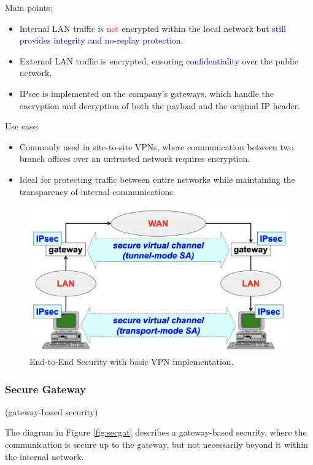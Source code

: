 Main points:
\begin{itemize}
    \item Internal LAN traffic is \textcolor{red}{not} encrypted within the local network but \textcolor{Blue}{still provides integrity and no-replay protection}.
    \item External LAN traffic is encrypted, ensuring \textcolor{Blue}{confidentiality} over the public network.
    \item IPsec is implemented on the company’s gateways, which handle the encryption and decryption of both the payload and the original IP header.
    \end{itemize}

Use case:
\begin{itemize}
\item Commonly used in site-to-site VPNs, where communication between two branch offices over an untrusted network requires encryption.
\item Ideal for protecting traffic between entire networks while maintaining the transparency of internal communications.
\end{itemize}

\begin{figure}[H]
    \includegraphics[width=\linewidth]{Images/NetSec/end_vpn.png}
    \caption{End-to-End Security with basic VPN implementation.}
    \label{fig:end_vpn}
\end{figure}

\subsubsection{Secure Gateway}
\begin{center}
    (gateway-based security)
\end{center}
The diagram in Figure \ref{fig:secgat} describes a gateway-based security, where the communication is secure up to the gateway, but not necessarily beyond it within the internal network.

